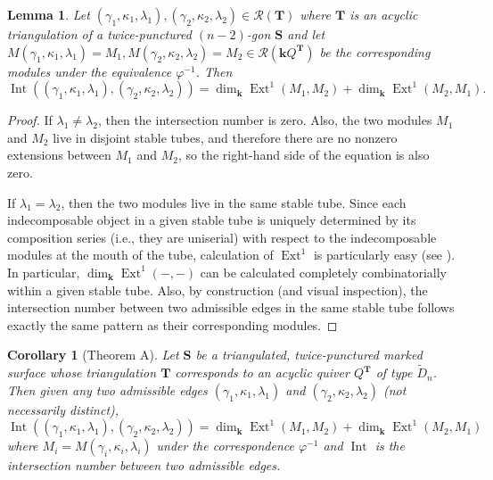 \documentclass[11pt]{amsart}
\theoremstyle{plain}
\newtheorem{lemma}[theorem]{Lemma}
\newtheorem{corollary}[theorem]{Corollary}
\theoremstyle{definition}
\numberwithin{equation}{section}
\def\surf{\mathbf{S}}                       %
\def\TT{\mathbf{T}}
\renewcommand{\k}{\mathbf{k}}
\newcommand{\Int}{\operatorname{Int}}
\newcommand{\Ext}{\operatorname{Ext}}
\begin{document}
\begin{lemma}
    Let $(\gamma_1, \kappa_1, \lambda_1), (\gamma_2, \kappa_2, \lambda_2) \in \mathcal{R}(\TT)$ where $\TT$ is an acyclic triangulation of a twice-punctured $(n-2)$-gon $\surf$ and let $M(\gamma_1, \kappa_1, \lambda_1) = M_1, M(\gamma_2, \kappa_2, \lambda_2) = M_2 \in \mathcal{R}(\k Q^\TT)$ be the corresponding modules under the equivalence $\varphi^{-1}$.
    Then $$\Int( (\gamma_1,\kappa_1, \lambda_1), (\gamma_2,\kappa_2, \lambda_2) ) = \dim_\k \Ext^1 (M_1, M_2) + \dim_\k \Ext^1 (M_2, M_1).$$
\end{lemma}

\begin{proof}
    If $\lambda_1 \neq \lambda_2$, then the intersection number is zero.
    Also, the two modules $M_1$ and $M_2$ live in disjoint stable tubes, and therefore there are no nonzero extensions between $M_1$ and $M_2$, so the right-hand side of the equation is also zero.

    If $\lambda_1 = \lambda_2$, then the two modules live in the same stable tube.
    Since each indecomposable object in a given stable tube is uniquely determined by its composition series (i.e., they are uniserial) with respect to the indecomposable modules at the mouth of the tube, calculation of $\Ext^1$ is particularly easy (see \cite[Example 2.12]{simson_elements_2007-1}).
    In particular, $\dim_\k \Ext^1 (-, -)$ can be calculated completely combinatorially within a given stable tube.
    Also, by construction (and visual inspection), the intersection number between two admissible edges in the same stable tube follows exactly the same pattern as their corresponding modules.
\end{proof}


\begin{corollary}[Theorem A]
    Let $\surf$ be a triangulated, twice-punctured marked surface whose triangulation $\TT$ corresponds to an acyclic quiver $Q^\TT$ of type $\widetilde{D}_n$. 
    Then given any two admissible edges $(\gamma_1, \kappa_1, \lambda_1)$ and $(\gamma_2, \kappa_2, \lambda_2)$ (not necessarily distinct), 
    $$\Int((\gamma_1, \kappa_1, \lambda_1), (\gamma_2, \kappa_2, \lambda_2)) = \dim_\k \Ext^1 (M_1, M_2) + \dim_\k \Ext^1 (M_2, M_1)$$ where $M_i = M(\gamma_i,\kappa_i, \lambda_i)$ under the correspondence $\varphi^{-1}$ and $\Int$ is the intersection number between two admissible edges.
\end{corollary}
\end{document}
